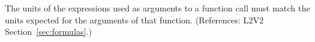 The units of the expressions used as arguments to a function call
must match the units expected for the arguments of that function.
(References: L2V2 Section~\ref{sec:formulas}.)
